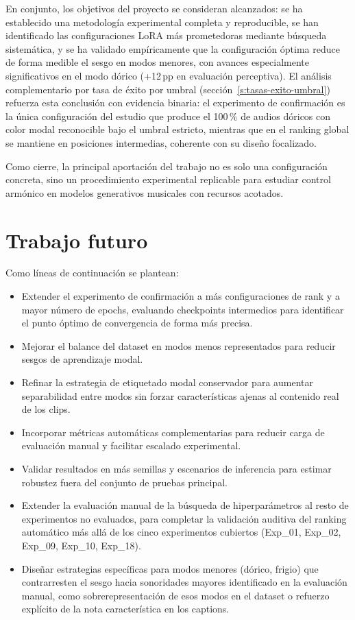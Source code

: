 \documentclass[%
    school=etsisi,%
    type=pfg,%
    degree=61CD,%
]{upm-report}
\begin{document}
En conjunto, los objetivos del proyecto se consideran alcanzados: se ha establecido una metodolog\'ia experimental completa y reproducible, se han identificado las configuraciones LoRA m\'as prometedoras mediante b\'usqueda sistem\'atica, y se ha validado emp\'iricamente que la configuraci\'on \'optima reduce de forma medible el sesgo en modos menores, con avances especialmente significativos en el modo d\'orico (+12\,pp en evaluaci\'on perceptiva). El an\'alisis complementario por tasa de \'exito por umbral (secci\'on~\ref{s:tasas-exito-umbral}) refuerza esta conclusi\'on con evidencia binaria: el experimento de confirmaci\'on es la \'unica configuraci\'on del estudio que produce el 100\,\% de audios d\'oricos con color modal reconocible bajo el umbral estricto, mientras que en el ranking global se mantiene en posiciones intermedias, coherente con su dise\~no focalizado.

Como cierre, la principal aportaci\'on del trabajo no es solo una configuraci\'on concreta, sino un procedimiento experimental replicable para estudiar control arm\'onico en modelos generativos musicales con recursos acotados.

\section{Trabajo futuro}

Como l\'ineas de continuaci\'on se plantean:

\begin{itemize}
    \item Extender el experimento de confirmaci\'on a m\'as configuraciones de rank y a mayor n\'umero de epochs, evaluando checkpoints intermedios para identificar el punto \'optimo de convergencia de forma m\'as precisa.
    \item Mejorar el balance del dataset en modos menos representados para reducir sesgos de aprendizaje modal.
    \item Refinar la estrategia de etiquetado modal conservador para aumentar separabilidad entre modos sin forzar caracter\'isticas ajenas al contenido real de los clips.
    \item Incorporar m\'etricas autom\'aticas complementarias para reducir carga de evaluaci\'on manual y facilitar escalado experimental.
    \item Validar resultados en m\'as semillas y escenarios de inferencia para estimar robustez fuera del conjunto de pruebas principal.
    \item Extender la evaluaci\'on manual de la b\'usqueda de hiperpar\'ametros al resto de experimentos no evaluados, para completar la validaci\'on auditiva del ranking autom\'atico m\'as all\'a de los cinco experimentos cubiertos (Exp\_01, Exp\_02, Exp\_09, Exp\_10, Exp\_18).
    \item Dise\~nar estrategias espec\'ificas para modos menores (d\'orico, frigio) que contrarresten el sesgo hacia sonoridades mayores identificado en la evaluaci\'on manual, como sobrerepresentaci\'on de esos modos en el dataset o refuerzo expl\'icito de la nota caracter\'istica en los captions.
\end{itemize}
\end{document}
